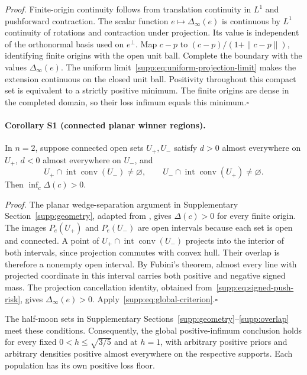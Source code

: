 \emph{Proof.}
Finite-origin continuity follows from translation continuity in $L^1$ and pushforward contraction. The scalar function $e\mapsto\Delta_\infty(e)$ is continuous by $L^1$ continuity of rotations and contraction under projection. Its value is independent of the orthonormal basis used on $e^\perp$. Map $c-p$ to $(c-p)/(1+\|c-p\|)$, identifying finite origins with the open unit ball. Complete the boundary with the values $\Delta_\infty(e)$. The uniform limit~\eqref{supp:eq:uniform-projection-limit} makes the extension continuous on the closed unit ball. Positivity throughout this compact set is equivalent to a strictly positive minimum. The finite origins are dense in the completed domain, so their loss infimum equals this minimum.\hfill$\square$

\paragraph{Corollary S1 (connected planar winner regions).}
In $n=2$, suppose connected open sets $U_+,U_-$ satisfy $d>0$ almost everywhere on $U_+$, $d<0$ almost everywhere on $U_-$, and
\[
 U_+\cap\operatorname{int}\operatorname{conv}(U_-)\ne\varnothing,
 \qquad
 U_-\cap\operatorname{int}\operatorname{conv}(U_+)\ne\varnothing.
\]
Then $\inf_c\Delta(c)>0$.

\emph{Proof.}
The planar wedge-separation argument in Supplementary Section~\ref{supp:geometry}, adapted from \citet{Hurtado2001}, gives $\Delta(c)>0$ for every finite origin. The images $P_e(U_+)$ and $P_e(U_-)$ are open intervals because each set is open and connected. A point of $U_+\cap\operatorname{int}\operatorname{conv}(U_-)$ projects into the interior of both intervals, since projection commutes with convex hull. Their overlap is therefore a nonempty open interval. By Fubini's theorem, almost every line with projected coordinate in this interval carries both positive and negative signed mass. The projection cancellation identity, obtained from~\eqref{supp:eq:signed-push-risk}, gives $\Delta_\infty(e)>0$. Apply~\eqref{supp:eq:global-criterion}.\hfill$\square$

The half-moon sets in Supplementary Sections~\ref{supp:geometry}--\ref{supp:overlap} meet these conditions. Consequently, the global positive-infimum conclusion holds for every fixed $0<h\leq\sqrt{3/5}$ and at $h=1$, with arbitrary positive priors and arbitrary densities positive almost everywhere on the respective supports. Each population has its own positive loss floor.

